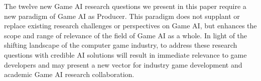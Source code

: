 \documentclass[conference]{IEEEtran}
\begin{document}
The twelve new Game AI research questions we present in this paper require a new paradigm of Game AI as Producer.
This paradigm does not supplant or replace existing research challenges or perspectives on Game AI, but enhances the scope and range of relevance of the field of Game AI as a whole.
In light of the shifting landscape of the computer game industry, to address these research questions with credible AI solutions will result in immediate relevance to game developers and may present a new vector for industry game development and academic Game AI research collaboration. 


%


%
%
\end{document}
